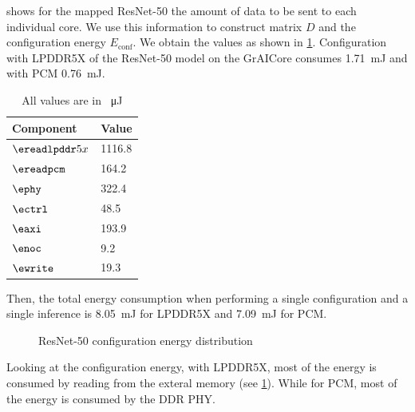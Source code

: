  shows for the mapped ResNet-50 the amount of data to be sent to each individual core.
We use this information to construct matrix $D$ and the configuration energy $E_\textrm{conf}$.
We obtain the values as shown in \cref{tab:resnet50_energy}.
Configuration with LPDDR5X of the ResNet-50 model on the GrAICore consumes \SI{1.71}{mJ} and with PCM \SI{0.76}{mJ}.

\begin{table}[hbtp]
    \centering
    \begin{tabular}{@{}ll@{}}
    \toprule
    \textbf{Component} & \textbf{Value} \\
    \midrule
    $\ereadlpddr5x$ & 1116.8 \\
    $\ereadpcm$ & 164.2 \\
    $\ephy$ & 322.4 \\
    $\ectrl$ & 48.5 \\
    $\eaxi$ & 193.9 \\
    $\enoc$ & 9.2 \\
    $\ewrite$ & 19.3 \\
    \bottomrule
    \end{tabular}
    \caption{All values are in \SI{}{\micro\joule}}
    \label{tab:resnet50_energy}
\end{table}

Then, the total energy consumption when performing a single configuration and a single inference is \SI{8.05}{mJ} for LPDDR5X and \SI{7.09}{mJ} for PCM.

\begin{figure}[hbtp]
    \centering
    \hfill
    \caption{ResNet-50 configuration energy distribution}
    \label{fig:resnet50_conf_energy_distribution}
\end{figure}


Looking at the configuration energy, with LPDDR5X, most of the energy is consumed by reading from the exteral memory (see \cref{fig:resnet50_conf_energy_distribution}).
While for PCM, most of the energy is consumed by the DDR PHY.


